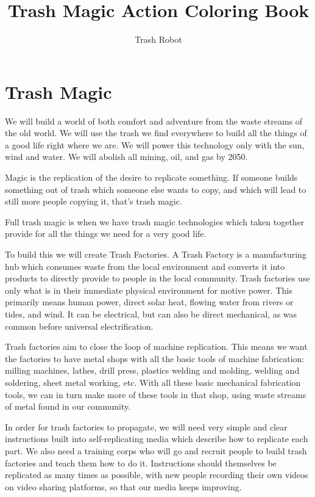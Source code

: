 \documentclass{report}
\title{Trash Magic Action Coloring Book}
\author{Trash Robot}
\begin{document}
\maketitle

\section{Trash Magic}

We will build a world of both comfort and adventure from the waste streams of the old world.  We will use the trash we find everywhere to build all the things of a good life right where we are.  We will power this technology only with the sun, wind and water.  We will abolish all mining, oil, and gas by 2050.

Magic is the replication of the desire to replicate something.  If someone builds something out of trash which someone else wants to copy, and which will lead to still more people copying it, that's trash magic.  

Full trash magic is when we have trash magic technologies which taken together provide for all the things we need for a very good life.

To build this we will create Trash Factories.  A Trash Factory is a manufacturing hub which consumes waste from the local environment and converts it into products to directly provide to people in the local community.  Trash factories use only what is in their immediate physical environment for motive power.  This primarily means human power, direct solar heat, flowing water from rivers or tides, and wind.  It can be electrical, but can also be direct mechanical, as was common before universal electrification.  

Trash factories aim to close the loop of machine replication. This means we want the factories to have metal shops with all the basic tools of machine fabrication: milling machines, lathes, drill press, plastics welding and molding, welding and soldering, sheet metal working, etc.  With all these basic mechanical fabrication tools, we can in turn make more of these tools in that shop, using waste streams of metal found in our community.  

In order for trash factories to propagate, we will need very simple and clear instructions built into self-replicating media which describe how to replicate each part.  We also need a training corps who will go and recruit people to build trash factories and teach them how to do it.  Instructions should themselves be replicated as many times as possible, with new people recording their own videos on video sharing platforms, so that our media keeps improving.  
\end{document}
